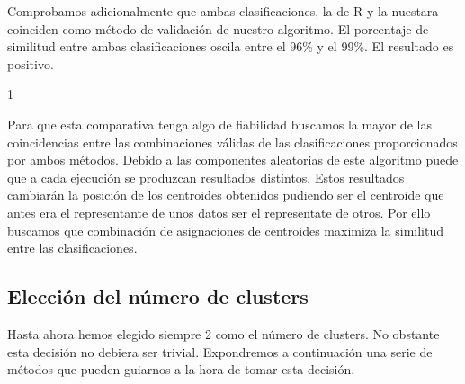 \documentclass [a4paper] {article}
\begin{document}
Comprobamos adicionalmente que ambas clasificaciones, la de R y la nuestara coinciden como método de validación de nuestro algoritmo.
El porcentaje de similitud entre ambas clasificaciones oscila entre el 96\% y el 99\%.
El resultado es positivo.
\begin{Schunk}
\begin{Soutput}
[1] 1
\end{Soutput}
\end{Schunk}
Para que esta comparativa tenga algo de fiabilidad buscamos la mayor de las coincidencias entre las combinaciones válidas de las clasificaciones proporcionados por ambos métodos.
Debido a las componentes aleatorias de este algoritmo puede que a cada ejecución se produzcan resultados distintos.
Estos resultados cambiarán la posición de los centroides obtenidos pudiendo ser el centroide que antes era el representante de unos datos ser el representate de otros.
Por ello buscamos que combinación de asignaciones de centroides maximiza la similitud entre las clasificaciones.

\newpage
\subsection{Elección del número de clusters}
Hasta ahora hemos elegido siempre 2 como el número de clusters.
No obstante esta decisión no debiera ser trivial.
Expondremos a continuación una serie de métodos que pueden guiarnos a la hora de tomar esta decisión.
\end{document}
